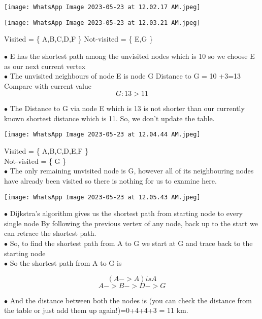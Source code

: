 \documentclass[23pt]{article}
\begin{document}
\begin{center}
\texttt{[image: WhatsApp Image 2023-05-23 at 12.02.17 AM.jpeg]}
\end{center}

\begin{center}
\texttt{[image: WhatsApp Image 2023-05-23 at 12.03.21 AM.jpeg]}
\end{center}


	Visited = \{ A,B,C,D,F \} 
	Not-visited  = \{ E,G \}

	$\bullet$ E has the shortest path among the unvisited nodes which is 10 so we choose E as our next current vertex \\
	$\bullet$ The unvisited neighbours of node E is node G
		Distance to G = 10 +3=13 \\

		Compare with current value
		$$   G: 13 > 11   $$ 

	$\bullet$ The Distance to G via node E which is 13 is not shorter than our currently known shortest distance which is 11. So, we don't update the table.\\
 \begin{center}
\texttt{[image: WhatsApp Image 2023-05-23 at 12.04.44 AM.jpeg]}
\end{center}

 		Visited = \{ A,B,C,D,E,F \} \\
		Not-visited = \{ G \} \\

	$\bullet$ The only remaining unvisited node is G, however all of its neighbouring nodes have already been visited so there is nothing for us to examine here.

\begin{center}
\texttt{[image: WhatsApp Image 2023-05-23 at 12.05.43 AM.jpeg]}
\end{center}
\Large
 	$\bullet$ Dijkstra's algorithm gives us the shortest path from starting node to every single node By following the previous vertex of any node, back up to the start we can retrace the shortest path. \\
     $\bullet$ So, to find the shortest path from A to G we start at G and trace back to the starting node \\

	$\bullet$ So the shortest path from A to G is 
            
		$$ (A->A) is A $$ 
		$$ A-> B-> D->G $$ 

	$\bullet$ And the distance between both the nodes is (you can check the distance from the table or just add them up again!)=0+4+4+3 = 11 km.
\end{document}
